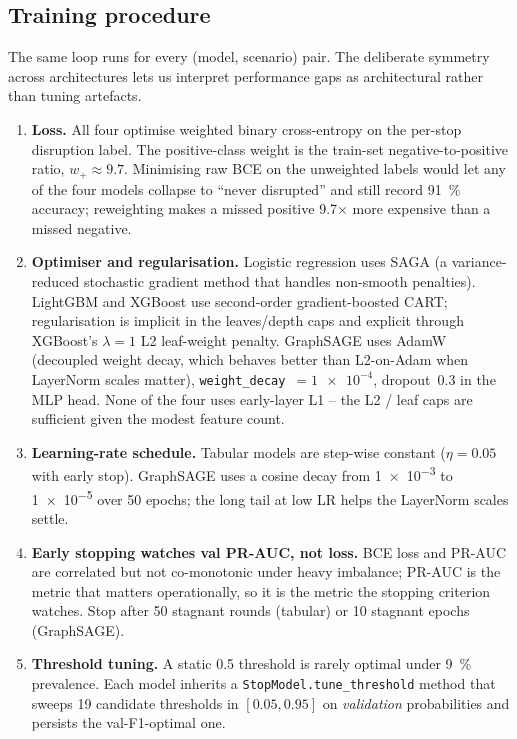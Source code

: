 \subsection{Training procedure}
\label{sec:training}

The same loop runs for every (model, scenario) pair. The deliberate symmetry across architectures lets us interpret performance gaps as architectural rather than tuning artefacts.

\begin{enumerate}[leftmargin=*]
    \item \textbf{Loss.} All four optimise weighted binary cross-entropy on the per-stop disruption label. The positive-class weight is the train-set negative-to-positive ratio, $w_+ \approx 9.7$. Minimising raw BCE on the unweighted labels would let any of the four models collapse to ``never disrupted'' and still record \SI{91}{\percent} accuracy; reweighting makes a missed positive 9.7$\times$ more expensive than a missed negative.
    \item \textbf{Optimiser and regularisation.} Logistic regression uses SAGA (a variance-reduced stochastic gradient method that handles non-smooth penalties). LightGBM and XGBoost use second-order gradient-boosted CART; regularisation is implicit in the leaves/depth caps and explicit through XGBoost's $\lambda=1$ L2 leaf-weight penalty. GraphSAGE uses AdamW (decoupled weight decay, which behaves better than L2-on-Adam when LayerNorm scales matter), \texttt{weight\_decay}~$=\num{1e-4}$, dropout~\num{0.3} in the MLP head. None of the four uses early-layer L1 -- the L2 / leaf caps are sufficient given the modest feature count.
    \item \textbf{Learning-rate schedule.} Tabular models are step-wise constant ($\eta=\num{0.05}$ with early stop). GraphSAGE uses a cosine decay from \num{1e-3} to \num{1e-5} over 50 epochs; the long tail at low LR helps the LayerNorm scales settle.
    \item \textbf{Early stopping watches val PR-AUC, not loss.} BCE loss and PR-AUC are correlated but not co-monotonic under heavy imbalance; PR-AUC is the metric that matters operationally, so it is the metric the stopping criterion watches. Stop after 50 stagnant rounds (tabular) or 10 stagnant epochs (GraphSAGE).
    \item \textbf{Threshold tuning.} A static \num{0.5} threshold is rarely optimal under \SI{9}{\percent} prevalence. Each model inherits a \texttt{StopModel.tune\_threshold} method that sweeps 19 candidate thresholds in $[\num{0.05}, \num{0.95}]$ on \emph{validation} probabilities and persists the val-F1-optimal one.

\end{enumerate}
